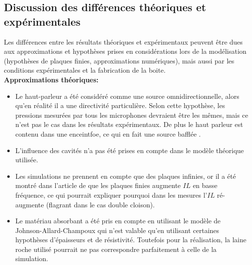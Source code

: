 \documentclass[12pt,foolscap]{report}
\begin{document}
	
	
	\subsection{Discussion des différences théoriques et expérimentales}
	Les différences entre les résultats théoriques et expérimentaux peuvent être dues aux approximations et hypothèses prises en considérations lors de la modélisation (hypothèses de plaques finies, approximations numériques), mais aussi par les conditions expérimentales et la fabrication de la boite.\\
	
	\textbf{Approximations théoriques:}\\
	\begin{itemize}[label=\textbullet]
		\item Le haut-parleur a été considéré comme une source omnidirectionnelle, alors qu'en réalité il a une directivité particulière. Selon cette hypothèse, les pressions mesurées par tous les microphones devraient être les mêmes, mais ce n'est pas le cas dans les résultats expérimentaux. De plus le haut parleur est contenu dans une enceintfoe, ce qui en fait une source bafflée . \\ 
		\item L'influence des cavités n'a pas été prises en compte dans le modèle théorique utilisée.\\ 
		\item Les simulations ne prennent en compte que des plaques infinies, or il a été montré dans l'article de \cite{villot_predicting_2001} que les plaques finies augmente $IL$ en basse fréquence, ce qui pourrait expliquer pourquoi dans les mesures l'$IL$ ré-augmente (flagrant dans le cas double cloison).\\
		\item Le matériau absorbant a été pris en compte en utilisant le modèle de Johnson-Allard-Champoux qui n'est valable qu'en utilisant certaines hypothèses d'épaisseurs et de résistivité. Toutefois pour la réalisation, la laine roche utilisé pourrait ne pas correspondre parfaitement à celle de la simulation.\\
	\end{itemize}
	
\end{document}

